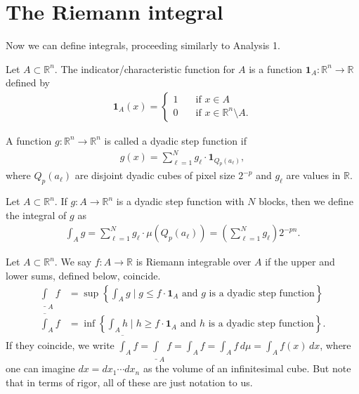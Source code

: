
\section{The Riemann integral}

Now we can define integrals, proceeding similarly to Analysis 1.

\begin{definition}\label{def:indicator-function}
	Let $A \subset \mathbb{R}^{n}$. The indicator/characteristic function for $A$ is a function $\boldsymbol{1}_{A}: \mathbb{R}^{n} \to \mathbb{R}$ defined by
	\begin{align*}
		\boldsymbol{1}_{A}(x) =
		\begin{cases}
			1 \quad & \text{if } x \in A                           \\
			0 \quad & \text{if } x \in \mathbb{R}^{n} \setminus A.
		\end{cases}
	\end{align*}
\end{definition}

\begin{definition}\label{def:dyadic-step-fun}
	A function $g: \mathbb{R}^{n} \to \mathbb{R}^{n}$ is called a dyadic step function if
	\begin{align*}
		g(x) = \sum_{\ell=1}^{N} g_{\ell} \cdot \boldsymbol{1}_{Q_{p}(a_{\ell})},
	\end{align*}
	where $Q_{p}(a_{\ell})$ are disjoint dyadic cubes of pixel size $2^{-p}$ and $g_{\ell}$ are values in $\mathbb{R}$.
\end{definition}

\begin{definition}\label{def:int-step-func}
	Let $A \subset \mathbb{R}^{n}$. If $g: A \to \mathbb{R}^{n}$ is a dyadic step function with $N$ blocks, then we define the integral of $g$ as
	\begin{align*}
		\int_{A} g = \sum_{\ell=1}^{N} g_{\ell} \cdot \mu(Q_{p}(a_{\ell})) = \left( \sum_{\ell=1}^{N} g_{\ell}  \right) 2^{-pn}.
	\end{align*}
\end{definition}

\begin{definition}\label{def:riemann-int}
	Let $A \subset \mathbb{R}^{n}$. We say $f:A \to \mathbb{R}$ is Riemann integrable over $A$ if the upper and lower sums, defined below, coincide.
	\begin{align*}
		\underline{\int}_{A} f & = \sup \left\{ \int_{A} g \mid g \leq f \cdot \boldsymbol{1}_{A} \text{ and } g \text{ is a dyadic step function} \right\}  \\
		\overline{\int}_{A} f  & = \inf \left\{ \int_{A} h \mid h \geq f \cdot \boldsymbol{1}_{A} \text{ and } h \text{ is a dyadic step function} \right\}.
	\end{align*}
	If they coincide, we write $\overline{ \int }_{A} f = \underline{\int}_{A} f = \int_{A} f = \int_{A}f \, d \mu = \int_{A} f(x) \, dx$, where one can imagine $dx = d x_{1} \cdots dx_{n}$ as the volume of an infinitesimal cube. But note that in terms of rigor, all of these are just notation to us.
\end{definition}

